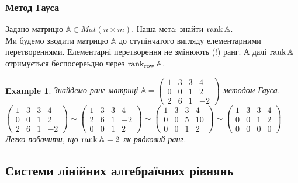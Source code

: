 \documentclass[a4paper, 10pt]{article}
\theoremstyle{theoremdd}
\newtheorem{example}[theorem]{Example}
\begin{document}
\subsubsection*{Метод Гауса}
Задано матрицю $\mathbb{A} \in Mat(n \times m)$. Наша мета: знайти $\rank \mathbb{A}$.\\
Ми будемо зводити матрицю $\mathbb{A}$ до ступінчатого вигляду елементарними перетвореннями. Елементарні перетворення не змінюють (!) ранг. А далі $\rank \mathbb{A}$ отримується беспосереьдно через $\rank_{\textrm{row}} \mathbb{A}$.
\begin{example}
Знайдемо ранг матриці $\mathbb{A} = \begin{pmatrix}
1 & 3 & 3 & 4 \\
0 & 0 & 1 & 2 \\
2 & 6 & 1 & -2
\end{pmatrix}$ методом Гауса.\\
$\begin{pmatrix}
1 & 3 & 3 & 4 \\
0 & 0 & 1 & 2 \\
2 & 6 & 1 & -2
\end{pmatrix} \sim \begin{pmatrix}
1 & 3 & 3 & 4 \\
2 & 6 & 1 & -2 \\
0 & 0 & 1 & 2
\end{pmatrix} \sim \begin{pmatrix}
1 & 3 & 3 & 4 \\
0 & 0 & 5 & 10 \\
0 & 0 & 1 & 2
\end{pmatrix} \sim \begin{pmatrix}
1 & 3 & 3 & 4 \\
0 & 0 & 1 & 2 \\
0 & 0 & 0 & 0
\end{pmatrix}$\\
Легко побачити, що $\rank \mathbb{A} = 2$ як рядковий ранг.
\end{example}

\subsection{Системи лінійних алгебраїчних рівнянь}
\end{document}
